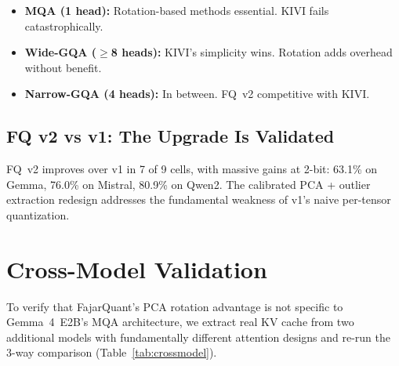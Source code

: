 \documentclass[10pt,twocolumn]{article}
\begin{document}
\begin{itemize}[nosep]
\item \textbf{MQA (1 head):} Rotation-based methods essential. KIVI
      fails catastrophically.
\item \textbf{Wide-GQA ($\geq$8 heads):} KIVI's simplicity wins.
      Rotation adds overhead without benefit.
\item \textbf{Narrow-GQA (4 heads):} In between. FQ~v2 competitive
      with KIVI.
\end{itemize}

\subsection{FQ v2 vs v1: The Upgrade Is Validated}

FQ~v2 improves over v1 in 7 of 9 cells, with massive gains at 2-bit:
63.1\% on Gemma, 76.0\% on Mistral, 80.9\% on Qwen2. The calibrated
PCA + outlier extraction redesign addresses the fundamental weakness
of v1's naive per-tensor quantization.

\section{Cross-Model Validation}
\label{sec:crossmodel}

To verify that FajarQuant's PCA rotation advantage is not specific to
Gemma~4~E2B's MQA architecture, we extract real KV cache from two
additional models with fundamentally different attention designs and
re-run the 3-way comparison (Table~\ref{tab:crossmodel}).
\end{document}
